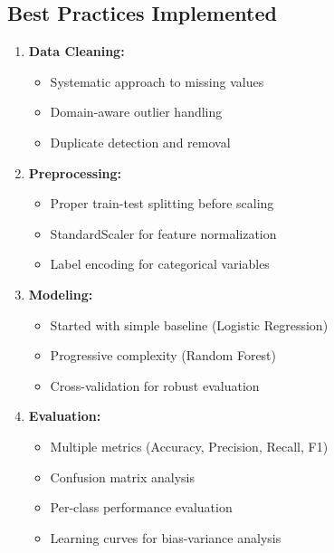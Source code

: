\documentclass[12pt,a4paper]{article}
\begin{document}
\subsection{Best Practices Implemented}
\begin{enumerate}
    \item \textbf{Data Cleaning:}
    \begin{itemize}
        \item Systematic approach to missing values
        \item Domain-aware outlier handling
        \item Duplicate detection and removal
    \end{itemize}
    
    \item \textbf{Preprocessing:}
    \begin{itemize}
        \item Proper train-test splitting before scaling
        \item StandardScaler for feature normalization
        \item Label encoding for categorical variables
    \end{itemize}
    
    \item \textbf{Modeling:}
    \begin{itemize}
        \item Started with simple baseline (Logistic Regression)
        \item Progressive complexity (Random Forest)
        \item Cross-validation for robust evaluation
    \end{itemize}
    
    \item \textbf{Evaluation:}
    \begin{itemize}
        \item Multiple metrics (Accuracy, Precision, Recall, F1)
        \item Confusion matrix analysis
        \item Per-class performance evaluation
        \item Learning curves for bias-variance analysis
    \end{itemize}
\end{enumerate}
\end{document}
